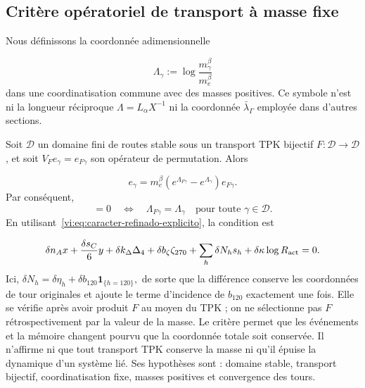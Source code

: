 \subsection{Critère opératoriel de transport à masse fixe
}

Nous définissons la coordonnée adimensionnelle

\begin{equation}
 \Lambda_\gamma:=\log\frac{m_\gamma^\beta}{m_e^\beta}
 \label{vi:eq:lambda-masa-ruta}
\end{equation}
dans une coordinatisation commune avec des masses positives. Ce symbole n’est ni la longueur
réciproque $\Lambda=L_\alpha X^{-1}$ ni la coordonnée
$\bar\lambda_\Gamma$ employée dans d’autres sections.


Soit $\mathscr D$ un domaine fini de routes stable sous un transport TPK
bijectif $F:\mathscr D\to\mathscr D$, et soit
$V_Fe_\gamma=e_{F\gamma}$ son opérateur de permutation. Alors

\begin{equation}
 [M^\beta,V_F]e_\gamma
 =m_e^\beta\left(e^{\Lambda_{F\gamma}}-e^{\Lambda_\gamma}\right)
 e_{F\gamma}.
 \label{vi:eq:conmutador-masa-transporte}
\end{equation}
Par conséquent,
\begin{equation}
 [M^\beta,V_F]=0
 \quad\Longleftrightarrow\quad
 \Lambda_{F\gamma}=\Lambda_\gamma
 \quad\text{pour toute }\gamma\in\mathscr D.
 \label{vi:eq:criterio-conservacion-masa}
\end{equation}
En utilisant~\eqref{vi:eq:caracter-refinado-explicito}, la condition est

\begin{equation}
 \delta n_Ax+\frac{\delta s_C}{6}y
 +\delta k_\Delta\Delta_4+\delta b_\zeta\zeta_{270}
 +\sum_h\delta N_hs_h
 +\delta\kappa\log R_{\rm act}=0.
 \label{vi:eq:balance-conservacion-masa}
\end{equation}
Ici,
\(
 \delta N_h=\delta\eta_h+
 \delta b_{120}\mathbf1_{\{h=120\}},
\)
de sorte que la différence conserve les coordonnées de tour originales et
ajoute le terme d’incidence de $b_{120}$ exactement une fois.
Elle se vérifie après avoir produit $F$ au moyen du TPK ; on ne sélectionne pas
$F$ rétrospectivement par la valeur de la masse. Le critère permet que
les événements et la mémoire changent pourvu que la coordonnée totale soit conservée.
Il n’affirme ni que tout transport TPK conserve la masse ni qu’il épuise la dynamique
d’un système lié. Ses hypothèses sont : domaine stable, transport
bijectif, coordinatisation fixe, masses positives et convergence des tours.


